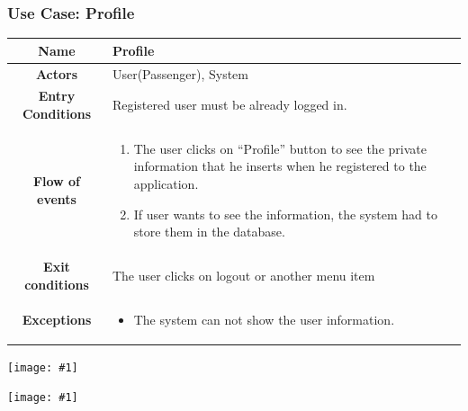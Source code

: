 \documentclass[11pt, a4paper,titlepage]{article}
\newcommand{\image}[1]{
	\begin{center}
		\noindent \texttt{[image: \#1]}
	\end{center}
	}
\begin{document}
\subsubsection{Use Case: Profile}
	\begin{tabularx}{\textwidth}{| c | X |}
		\hline
		\textbf{Name} & 
		Profile
		\\
		\hline
		\textbf{Actors} & 
		User(Passenger), System 
		\\
		\hline
		\textbf{Entry Conditions} &
		Registered user must be already logged in. 
		\\
		\hline
		\textbf{Flow of events} & 
		\begin{enumerate}
			\item The user clicks on “Profile” button to see the private information that he inserts when he registered to the application.
			\item If user wants to see the information, the system had to store them in the database.
				
		\end{enumerate}						
		\\
		\hline
		\textbf{Exit conditions} & 
		The user clicks on logout or another menu item
		\\
		\hline
		\textbf{Exceptions} & 
		\begin{itemize}
			\item The system can not show the user information.
		\end{itemize} 
		\\
		\hline		
	\end{tabularx}
	\image{usecase_profile.png}
	\image{diagram_sequence_profile.png}
	\newpage
\end{document}
